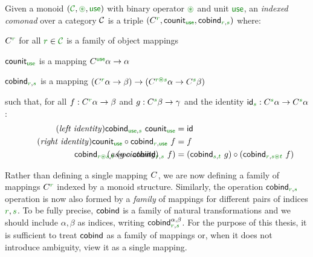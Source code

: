 \begin{definition}
Given a monoid $(\C, \cseq, \cunit)$ with binary operator $\cseq$ and unit $\cunit$, an 
\emph{indexed comonad} over a category $\mathcal{C}$ is a triple 
$(\ctyp{\cclrd{r}{}}, \ident{counit}_{\cunit}, \ident{cobind}_{\cclrd{r}, \cclrd{s}})$ where:

\begin{compactitem}
\item $\ctyp{\cclrd{r}}{}$ for all $\cclrd{r} \in \C$ is a family of object mappings 
\item $\ident{counit}_{\cunit}$ is a mapping $\ctyp{\cunit}{\alpha} \rightarrow \alpha$ 
\item $\ident{cobind}_{\cclrd{r}, \cclrd{s}}$ is a mapping $(\ctyp{\cclrd{r}}{\alpha} \rightarrow \beta) 
  \rightarrow (\ctyp{\cclrd{r}\cseq\cclrd{s}}{\alpha} \rightarrow \ctyp{\cclrd{s}}{\beta})$
\end{compactitem}
such that, for all $f:\ctyp{\cclrd{r}}{\alpha} \rightarrow \beta$ and $g:\ctyp{\cclrd{s}}{\beta} \rightarrow \gamma$
and the identity $\idf{\cclrd{s}} : \ctyp{\cclrd{s}}\alpha \rightarrow \ctyp{\cclrd{s}}\alpha$:
\begin{align}
\tag{\emph{left identity}}
  \ident{cobind}_{\cunit, \cclrd{s}}~\ident{counit}_{\cunit} &= \idf{}
  \\
\tag{\emph{right identity}}
  \ident{counit}_{\cunit} \circ \ident{cobind}_{\cclrd{r}, \cunit}~f &= f
  \\
\tag{\emph{associativity}}
\hspace{-10em}
  \ident{cobind}_{\cclrd{r}\cseq\cclrd{s},\cclrd{t}}~(g \circ \ident{cobind}_{\cclrd{r}, \cclrd{s}}~f) &= 
    (\ident{cobind}_{\cclrd{s}, \cclrd{t}}~g) \circ (\ident{cobind}_{\cclrd{r}, \cclrd{s}\cseq\cclrd{t}}~f)
\end{align}
\end{definition}

\noindent
Rather than defining a single mapping $C^{}$, we are now defining a family of mappings 
$\ctyp{\cclrd{r}}{}$ indexed by a monoid structure. Similarly, the operation $\ident{cobind}_{\cclrd{r}, \cclrd{s}}$ 
operation is now also formed by a \emph{family} of mappings for different pairs of indices 
$\cclrd{r}, \cclrd{s}$. To be fully precise, $\textnormal{\sffamily cobind}$ is a family of natural transformations 
and we should include $\alpha, \beta$ as indices, writing $\ident{cobind}_{\cclrd{r},\cclrd{s}}^{\alpha, \beta}$.
For the purpose of this thesis, it is sufficient to treat $\textnormal{\sffamily cobind}$ as a family of
mappings or, when it does not  introduce ambiguity, view it as a single mapping.

